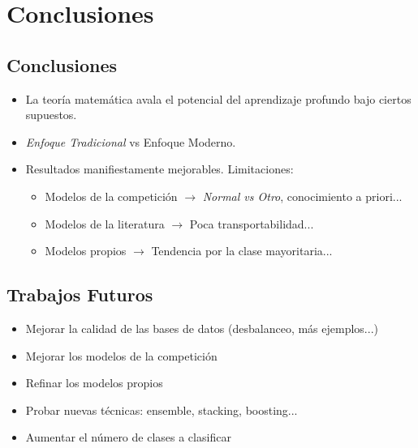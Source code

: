 \section{Conclusiones}


\subsection{Conclusiones}

\begin{frame}
\pause
\begin{itemize}
    \setlength\itemsep{1.5em}
    \item La teoría matemática avala el potencial del aprendizaje profundo bajo ciertos supuestos.
    \pause
    \item {\color{TurkishRose}\textit{Enfoque Tradicional}} vs Enfoque Moderno.
    \pause
    \item Resultados manifiestamente mejorables. Limitaciones:
        \begin{itemize}
            \item Modelos de la competición $\rightarrow$ \textit{Normal vs Otro}, conocimiento a priori...
            \item Modelos de la literatura $\rightarrow$ Poca transportabilidad...
            \item Modelos propios $\rightarrow$ Tendencia por la clase mayoritaria...
        \end{itemize}
\end{itemize}
\end{frame}

\subsection{Trabajos Futuros}

\begin{frame}
\pause
\begin{itemize}
    \setlength\itemsep{1.5em}
    \item Mejorar la calidad de las bases de datos (desbalanceo, más ejemplos...)
    \pause
    \item Mejorar los modelos de la competición
    \pause
    \item Refinar los modelos propios
    \pause
    \item Probar nuevas técnicas: ensemble, stacking, boosting...
    \pause
    \item Aumentar el número de clases a clasificar
\end{itemize}
\end{frame}

